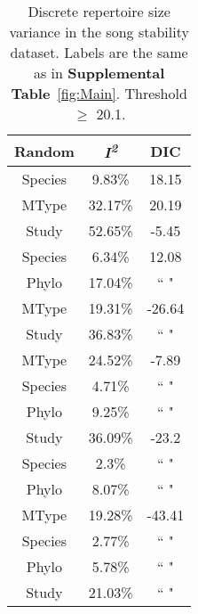 \documentclass{article}
\begin{document}
  \begin{table}[H]
  \centering
  \caption{Discrete repertoire size variance in the song stability dataset. Labels are the same as in \textbf{Supplemental Table}~\ref{fig:Main}. Threshold $\ge$ 20.1.} 
  \begin{tabular}{ccc}
  \hline
  Random & \textit{I\textsuperscript{2}} & DIC \\ 
  \hline
  Species & 9.83\% & 18.15 \\ \hdashline
  MType & 32.17\% & 20.19 \\ \hdashline
  Study & 52.65\% & -5.45 \\ \hdashline
  Species & 6.34\% & 12.08 \\ 
  Phylo & 17.04\% & `` " \\ \hdashline
  MType & 19.31\% & -26.64 \\ 
  Study & 36.83\% & `` " \\ \hdashline
  MType & 24.52\% & -7.89 \\ 
  Species & 4.71\% & `` " \\ 
  Phylo & 9.25\% & `` " \\ \hdashline
  Study & 36.09\% & -23.2 \\ 
  Species & 2.3\% & `` " \\ 
  Phylo & 8.07\% & `` " \\ \hdashline
  MType & 19.28\% & -43.41 \\ 
  Species & 2.77\% & `` " \\ 
  Phylo & 5.78\% & `` " \\ 
  Study & 21.03\% & `` " \\ 
  \hline
  \end{tabular}
  \end{table}
\end{document}
